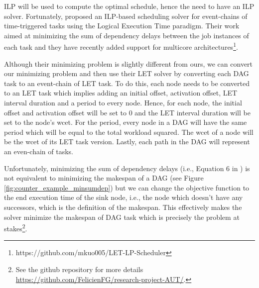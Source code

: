 ILP will be used to compute the optimal schedule,
hence the need to have an ILP solver.
Fortunately, 
\citet{yip2023letsynchronise} proposed an ILP-based
scheduling solver for event-chains of time-triggered tasks
using the Logical Execution Time paradigm\cite{kirsch2012logical}.
Their work aimed at minimizing the sum of dependency delays 
between the job instances of each task and they have recently added
support for multicore architectures\footnote{https://github.com/mkuo005/LET-LP-Scheduler}.

Although their minimizing problem is slightly different from ours, 
we can convert our minimizing problem and then use their LET solver by converting each DAG task 
to an event-chain of LET task.
To do this, each node needs to be converted to an LET task which 
implies adding an initial offset, activation offset, LET interval duration and a period
to every node.
Hence, for each node, the initial offset and activation offset will
be set to 0 and the LET interval duration will be set to the node's wcet.
For the period, every node in a DAG will have the same period which will
be equal to the total workload squared.
The wcet of a node will be the wcet of its LET task version.
Lastly, each path in the DAG will represent an even-chain of tasks.

Unfortunately, minimizing the sum of dependency delays (i.e., Equation 6 in \citet{yip2023letsynchronise}) is not equivalent
to minimizing the makespan of a DAG (see Figure \ref{fig:counter_example_minsumdep})
but we can change the objective function to the end execution time
of the sink node, i.e., the node which doesn't have any successors,
which is the definition of the makespan.
This effectively makes the solver minimize the makespan of DAG task
which is precisely the problem at stakes\footnote{See the github repository for more details \url{https://github.com/FelicienFG/research-project-AUT/}.}.

